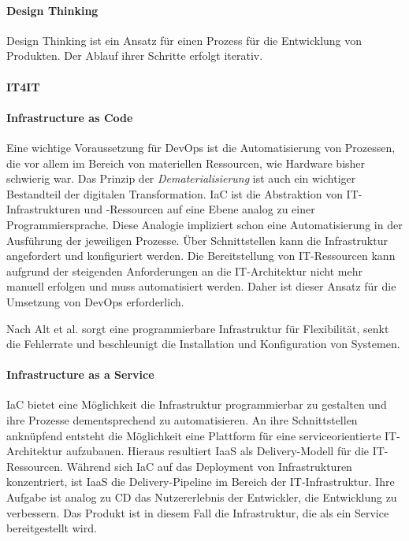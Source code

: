 \cite{Alt2017}

\paragraph{Design Thinking}
Design Thinking ist ein Ansatz für einen Prozess für die Entwicklung von Produkten. Der Ablauf ihrer Schritte erfolgt iterativ. 

\paragraph{IT4IT}

\paragraph{Infrastructure as Code}
Eine wichtige Voraussetzung für DevOps ist die Automatisierung von Prozessen, die vor allem im Bereich von materiellen Ressourcen, wie Hardware bisher schwierig war. Das Prinzip der \emph{Dematerialisierung} ist auch ein wichtiger Bestandteil der digitalen Transformation.
\ac{IaC} ist die Abstraktion von IT-Infrastrukturen und -Ressourcen auf eine Ebene analog zu einer Programmiersprache. Diese Analogie impliziert schon eine Automatisierung in der Ausführung der jeweiligen Prozesse. Über Schnittstellen kann die Infrastruktur angefordert und konfiguriert werden. Die Bereitstellung von IT-Ressourcen kann aufgrund der steigenden Anforderungen an die IT-Architektur \cite{Brockhoff2006, Bussmann2006, Alt2017} nicht mehr manuell erfolgen und muss automatisiert werden. Daher ist dieser Ansatz für die Umsetzung von DevOps erforderlich.

Nach Alt et al. \cite{Alt2017} sorgt eine programmierbare Infrastruktur für Flexibilität, senkt die Fehlerrate und beschleunigt die Installation und Konfiguration von Systemen.

\paragraph{Infrastructure as a Service}
\ac{IaC} bietet eine Möglichkeit die Infrastruktur programmierbar zu gestalten und ihre Prozesse dementsprechend zu automatisieren. An ihre Schnittstellen anknüpfend entsteht die Möglichkeit eine Plattform für eine serviceorientierte IT-Architektur aufzubauen. Hieraus resultiert \ac{IaaS} als Delivery-Modell \cite{Alt2017} für die IT-Ressourcen. Während sich \ac{IaC} auf das Deployment von Infrastrukturen konzentriert, ist \ac{IaaS} die Delivery-Pipeline im Bereich der IT-Infrastruktur. Ihre Aufgabe ist analog zu \ac{CD} das Nutzererlebnis der Entwickler, die Entwicklung zu verbessern. Das Produkt ist in diesem Fall die Infrastruktur, die als ein Service bereitgestellt wird.

